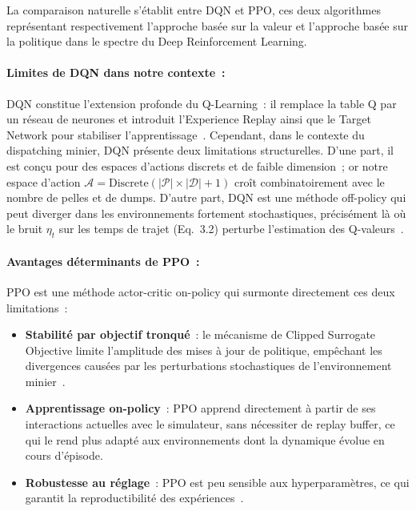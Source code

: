\documentclass[11pt,a4paper]{report}
\begin{document}
La comparaison naturelle s'établit entre DQN et PPO, ces deux algorithmes représentant respectivement l'approche basée sur la valeur et l'approche basée sur la politique dans le spectre du Deep Reinforcement Learning.

\paragraph{Limites de DQN dans notre contexte~:}
DQN constitue l'extension profonde du Q-Learning~: il remplace la table Q par un réseau de neurones et introduit l'Experience Replay ainsi que le Target Network pour stabiliser l'apprentissage~\cite{MoezKrichen2022}. Cependant, dans le contexte du dispatching minier, DQN présente deux limitations structurelles. D'une part, il est conçu pour des espaces d'actions discrets et de faible dimension~; or notre espace d'action $\mathcal{A} = \text{Discrete}(|\mathcal{P}| \times |\mathcal{D}| + 1)$ croît combinatoirement avec le nombre de pelles et de dumps. D'autre part, DQN est une méthode off-policy qui peut diverger dans les environnements fortement stochastiques, précisément là où le bruit $\eta_t$ sur les temps de trajet (Eq.~3.2) perturbe l'estimation des Q-valeurs~\cite{MoezKrichen2022}.

\paragraph{Avantages déterminants de PPO~:}
PPO est une méthode actor-critic on-policy qui surmonte directement ces deux limitations~:
\begin{itemize}
    \item \textbf{Stabilité par objectif tronqué}~: le mécanisme de Clipped Surrogate Objective limite l'amplitude des mises à jour de politique, empêchant les divergences causées par les perturbations stochastiques de l'environnement minier~\cite{Schulman2017PPO, MoezKrichen2022}.
    \item \textbf{Apprentissage on-policy}~: PPO apprend directement à partir de ses interactions actuelles avec le simulateur, sans nécessiter de replay buffer, ce qui le rend plus adapté aux environnements dont la dynamique évolue en cours d'épisode.
    \item \textbf{Robustesse au réglage}~: PPO est peu sensible aux hyperparamètres, ce qui garantit la reproductibilité des expériences~\cite{MoezKrichen2022, Szatmári2025}.
\end{itemize}
\end{document}
